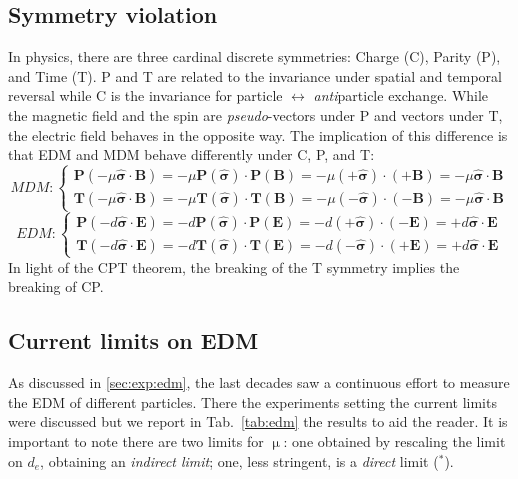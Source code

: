 \begin{refsection}
    \subsection{Symmetry violation}
        In physics, there are three cardinal discrete symmetries: Charge (C), Parity (P), and Time (T).
        P and T are related to the invariance under spatial and temporal reversal while C is the invariance for particle $\leftrightarrow$ \textit{anti}particle exchange.
        While the magnetic field and the spin are \textit{pseudo}-vectors under P and vectors under T, the electric field behaves in the opposite way.
        The implication of this difference is that EDM and MDM behave differently under C, P, and T:
        \begin{equation}
            MDM : 
            \begin{cases}
                \textbf{P} (-\mu\bm{\hat{\sigma}\cdot B}) = -\mu \bm{P(\hat{\sigma}) \cdot P(B)} = -\mu\bm{(+\hat{\sigma})\cdot (+B)} = -\mu\bm{\hat{\sigma}\cdot B} \\
                \textbf{T} (-\mu\bm{\hat{\sigma}\cdot B}) = -\mu \bm{T(\hat{\sigma}) \cdot T(B)} = -\mu\bm{(-\hat{\sigma})\cdot (-B)} = -\mu\bm{\hat{\sigma}\cdot B} 
            \end{cases}
        \end{equation}
        \begin{equation}
            EDM : 
            \begin{cases}
                \textbf{P} (-d\bm{\hat{\sigma}\cdot E}) = -d \bm{P(\hat{\sigma}) \cdot P(E)} = -d\bm{(+\hat{\sigma})\cdot (-E)} = +d\bm{\hat{\sigma}\cdot E} \\
                \textbf{T} (-d\bm{\hat{\sigma}\cdot E}) = -d \bm{T(\hat{\sigma}) \cdot T(E)} = -d\bm{(-\hat{\sigma})\cdot (+E)} = +d\bm{\hat{\sigma}\cdot E}          
            \end{cases}
        \end{equation}
        In light of the CPT theorem, the breaking of the T symmetry implies the breaking of CP.
        
    \subsection{Current limits on EDM}
        As discussed in \ref{sec:exp:edm}, the last decades saw a continuous effort to measure the EDM of different particles.
        There the experiments setting the current limits were discussed but we report in Tab.~\ref{tab:edm} the results to aid the reader.
        It is important to note there are two limits for $\upmu$: one obtained by rescaling the limit on $d_e$, obtaining an \textit{indirect limit}; one, less stringent, is a \textit{direct} limit ($^*$).


\end{refsection}
